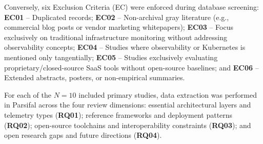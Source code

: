 Conversely, six Exclusion Criteria (EC) were enforced during database screening: \textbf{EC01} -- Duplicated records; \textbf{EC02} -- Non-archival gray literature (e.g., commercial blog posts or vendor marketing whitepapers); \textbf{EC03} -- Focus exclusively on traditional infrastructure monitoring without addressing observability concepts; \textbf{EC04} -- Studies where observability or Kubernetes is mentioned only tangentially; \textbf{EC05} -- Studies exclusively evaluating proprietary/closed-source SaaS tools without open-source baselines; and \textbf{EC06} -- Extended abstracts, posters, or non-empirical summaries.

For each of the $N = 10$ included primary studies, data extraction was performed in Parsifal across the four review dimensions: essential architectural layers and telemetry types (\textbf{RQ01}); reference frameworks and deployment patterns (\textbf{RQ02}); open-source toolchains and interoperability constraints (\textbf{RQ03}); and open research gaps and future directions (\textbf{RQ04}).
